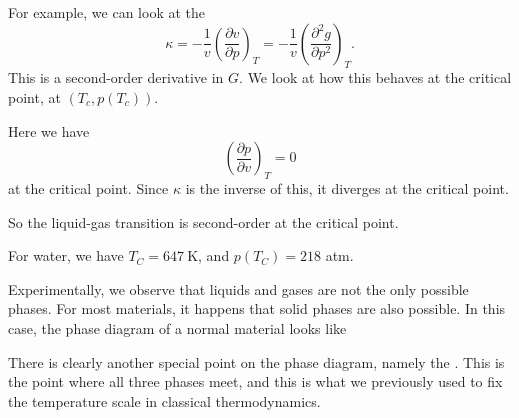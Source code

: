 \documentclass[a4paper]{article}
\begin{document}
For example, we can look at the \index{$\kappa$}
\[
  \kappa = -\frac{1}{v} \left(\frac{\partial v}{\partial p}\right)_T = -\frac{1}{v} \left(\frac{\partial^2 g}{\partial p^2}\right)_T.
\]
This is a second-order derivative in $G$. We look at how this behaves at the critical point, at $(T_c, p(T_c))$.
\begin{center}
\end{center}
Here we have
\[
  \left(\frac{\partial p}{\partial v}\right)_T = 0
\]
at the critical point. Since $\kappa$ is the inverse of this, it diverges at the critical point.

So the liquid-gas transition is second-order at the critical point.

\begin{eg}
  For water, we have $T_C = \SI{647}{\kelvin}$, and $p(T_C) = 218$ atm.
\end{eg}

Experimentally, we observe that liquids and gases are not the only possible phases. For most materials, it happens that solid phases are also possible. In this case, the phase diagram of a normal material looks like
\begin{center}
\end{center}
There is clearly another special point on the phase diagram, namely the . This is the point where all three phases meet, and this is what we previously used to fix the temperature scale in classical thermodynamics.
\end{document}
